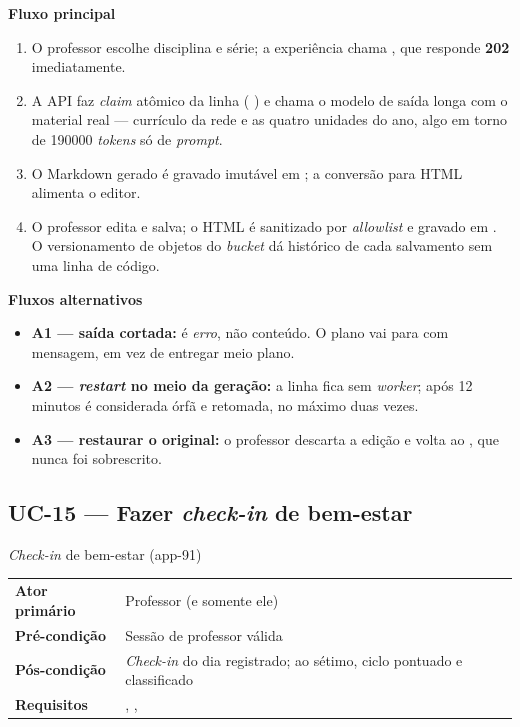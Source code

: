 \textbf{Fluxo principal}
\begin{enumerate}
  \item O professor escolhe disciplina e série; a experiência chama
    , que responde \textbf{202} imediatamente.
  \item A API faz \emph{claim} atômico da linha ( \seta{}
    ) e chama o modelo de saída longa com o material real ---
    currículo da rede e as quatro unidades do ano, algo em torno de
    \num{190000} \emph{tokens} só de \emph{prompt}.
  \item O Markdown gerado é gravado imutável em
    ; a conversão para HTML alimenta o
    editor.
  \item O professor edita e salva; o HTML é sanitizado por \emph{allowlist} e
    gravado em . O versionamento de objetos do \emph{bucket} dá
    histórico de cada salvamento sem uma linha de código.
\end{enumerate}

\textbf{Fluxos alternativos}
\begin{itemize}
  \item \textbf{A1 --- saída cortada:}  é
    \emph{erro}, não conteúdo. O plano vai para  com mensagem, em vez
    de entregar meio plano.
  \item \textbf{A2 --- \emph{restart} no meio da geração:} a linha fica
     sem \emph{worker}; após 12 minutos é considerada órfã e
    retomada, no máximo duas vezes.
  \item \textbf{A3 --- restaurar o original:} o professor descarta a edição e
    volta ao , que nunca foi sobrescrito.
\end{itemize}

\subsection{UC-15 --- Fazer \emph{check-in} de bem-estar}

\begin{especificacao}{ \emph{Check-in} de bem-estar (app-91)}
\begin{tabularx}{\linewidth}{@{}L{28mm}X@{}}
\textbf{Ator primário} & Professor (e somente ele)\\
\textbf{Pré-condição} & Sessão de professor válida\\
\textbf{Pós-condição} & \emph{Check-in} do dia registrado; ao sétimo, ciclo
  pontuado e classificado\\
\textbf{Requisitos} & , , \\
\end{tabularx}
\end{especificacao}

